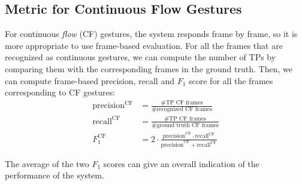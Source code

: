 \subsection{Metric for Continuous Flow Gestures}
For continuous \textit{flow} (CF) gestures, the system responds frame by frame,
so it is more appropriate to use frame-based evaluation. For all the frames that are
recognized as continuous gestures, we can compute the number of TPs by
comparing them with the corresponding frames in the ground truth. Then, we can
compute frame-based precision, recall and $F_1$ score for all the frames
corresponding to CF gestures:
\begin{align}
\text{precision}^{\text{CF}} &=\frac{\text{\# TP CF frames}}{\text{\# recognized
CF frames}}
\\
\text{recall}^{\text{CF}} &=\frac{\text{\# TP CF frames}}{\text{\# ground truth
CF frames}}\\
F_1^{\text{CF}} &= 2\cdot \frac{\text{precision}^{\text{CF}} \cdot
\text{recall}^{\text{CF}}}{\text{precision}^{\text{CF}} +
\text{recall}^{\text{CF}}}
\end{align}


The average of the two $F_1$ scores can give an overall indication of the
performance of the system.
